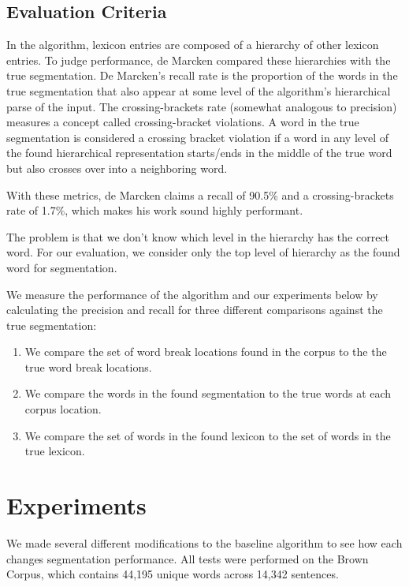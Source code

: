 \documentclass[11pt, oneside, fleqn]{article}
\begin{document}
  \subsection{Evaluation Criteria}

	In the algorithm, lexicon entries are composed of a hierarchy of other lexicon entries. To judge performance, de Marcken compared these hierarchies with the true segmentation. De Marcken's recall rate is the proportion of the words in the true segmentation that also appear at some level of the algorithm's hierarchical parse of the input. The crossing-brackets rate (somewhat analogous to precision) measures a concept called crossing-bracket violations. A word in the true segmentation is considered a crossing bracket violation if a word in any level of the found hierarchical representation starts/ends in the middle of the true word but also crosses over into a neighboring word.
    
    With these metrics, de Marcken claims a recall of 90.5\% and a crossing-brackets rate of 1.7\%, which makes his work sound highly performant.

	The problem is that we don't know which level in the hierarchy has the correct word. For our evaluation, we consider only the top level of hierarchy as the found word for segmentation.

	We measure the performance of the algorithm and our experiments below by calculating the precision and recall for three different comparisons against the true segmentation:
	
	\begin{enumerate}
		\item We compare the set of word break locations found in the corpus to the the true word break locations.
		\item We compare the words in the found segmentation to the true words at each corpus location.
		\item We compare the set of words in the found lexicon to the set of words in the true lexicon.
	\end{enumerate}

  \section{Experiments}
  
  We made several different modifications to the baseline algorithm to see how each changes segmentation performance. All tests were performed on the Brown Corpus, which contains 44,195 unique words across 14,342 sentences.
\end{document}
